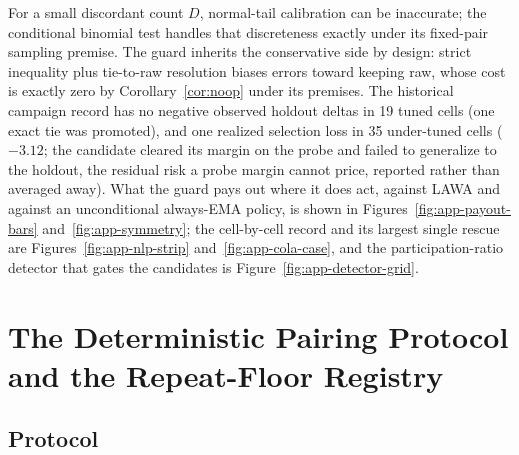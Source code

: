 \begin{remarkx}
For a small discordant count $D$, normal-tail calibration can be inaccurate;
the conditional binomial test handles that discreteness exactly under its
fixed-pair sampling premise. The guard inherits the conservative
side by design: strict inequality plus tie-to-raw resolution biases errors
toward keeping raw, whose cost is exactly zero by
Corollary~\ref{cor:noop} under its premises. The historical campaign record
has no negative observed holdout deltas in 19 tuned cells (one exact tie was
promoted), and one realized selection loss in 35
under-tuned cells ($-3.12$; the candidate cleared its margin on the probe and
failed to generalize to the holdout, the residual risk a probe margin
cannot price, reported rather than averaged away). What the guard pays out
where it does act, against LAWA and against an unconditional always-EMA
policy, is shown in Figures~\ref{fig:app-payout-bars} and~\ref{fig:app-symmetry}; the
cell-by-cell record and its largest single rescue are
Figures~\ref{fig:app-nlp-strip} and~\ref{fig:app-cola-case}, and the
participation-ratio detector that gates the candidates is
Figure~\ref{fig:app-detector-grid}.
\end{remarkx}

\section{The Deterministic Pairing Protocol and the Repeat-Floor
Registry}
\label{sec:protocol}

\subsection{Protocol}

